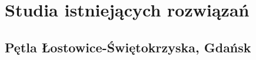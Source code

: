 \documentclass[twoside,12pt]{article}
\begin{document}
%
%	
%	
%	
	

	\clearpage
	\section{Studia istniejących rozwiązań}

	\subsection{Pętla Łostowice-Świętokrzyska, Gdańsk}
	
\end{document}
